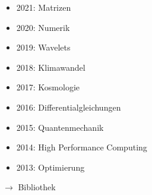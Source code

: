 \begin{frame}[t]
\begin{columns}[t,onlytextwidth]
\begin{column}{0.52\textwidth}
\begin{itemize}
\item 2021: Matrizen
\item 2020: Numerik
\item 2019: Wavelets
\item 2018: Klimawandel
\item 2017: Kosmologie
\item 2016: Differentialgleichungen
\item 2015: Quantenmechanik
\item 2014: High Performance Computing
\item 2013: Optimierung
\end{itemize}
{$\rightarrow$ Bibliothek}
\end{column}
\end{columns}
\end{frame}
\egroup
